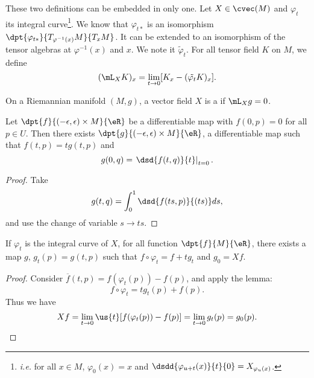 These two definitions can be embedded in only one. Let $X\in\cvec(M)$ and $\varphi_t$ its integral curve\footnote{\textit{i.e.} for all $x\in M$, $\varphi_0(x)=x$ and $\dsdd{\varphi_{u+t}(x)}{t}{0}=X_{\varphi_u(x)}$.}. We know that $\varphi_{t*}$ is an isomorphism $\dpt{\varphi_{t*}}{T_{\varphi^{-1}(x)}M}{T_xM}$. It can be extended to an isomorphism of the tensor algebras at $\varphi^{-1}(x)$ and $x$. We note it $\tilde{\varphi}_t$. For all tensor field $K$ on $M$, we define
\[
	(\mL_XK)_x=\lim_{t\to 0}[K_x-(\tilde{\varphi_t}K)_x].
\]

On a Riemannian manifold $(M,g)$, a vector field $X$ is a  if $\mL_Xg=0$.



\begin{lemma}
	Let $\dpt{f}{(-\epsilon,\epsilon)\times M}{\eR}$ be a differentiable map with $f(0,p)=0$ for all $p\in U$. Then there exists $\dpt{g}{(-\epsilon,\epsilon)\times M}{\eR}$, a differentiable map such that $f(t,p)=tg(t,p)$ and
	\[
		g(0,q)=\left.\dsd{f(t,q)}{t}\right|_{t=0}.
	\]
\end{lemma}
\begin{proof}
	Take
	\[
		g(t,q)=\int_0^1\dsd{f(ts,p)}{(ts)}ds,
	\]
	and use the change of variable $s\to ts$.
\end{proof}

\begin{lemma}
	If $\varphi_t$ is the integral curve of $X$, for all function $\dpt{f}{M}{\eR}$, there exists a map $g$, $g_t(p)=g(t,p)$ such that
	$f\circ\varphi_t=f+tg_t$ and $g_0=Xf$.
\end{lemma}

\begin{proof}
	Consider $\overline{f}(t,p)=f(\varphi_t(p))-f(p)$, and apply the lemma:
	\[
		f\circ\varphi_t=tg_t(p)+f(p).
	\]
	Thus we have
	\[
		Xf=\lim_{t\to 0}\us{t}[f(\varphi_t(p))-f(p)]=\lim_{t\to 0}g_t(p)=g_0(p).
	\]
\end{proof}

